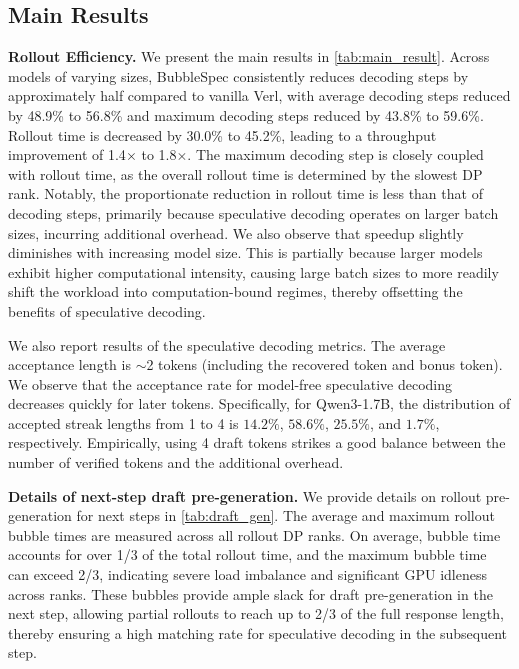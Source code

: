 \subsection{Main Results}
\textbf{Rollout Efficiency.} We present the main results in \autoref{tab:main_result}. Across models of varying sizes, BubbleSpec consistently reduces decoding steps by approximately half compared to vanilla Verl, with average decoding steps reduced by 48.9\% to 56.8\% and maximum decoding steps reduced by 43.8\% to 59.6\%. Rollout time is decreased by 30.0\% to 45.2\%, leading to a throughput improvement of 1.4$\times$ to 1.8$\times$. The maximum decoding step is closely coupled with rollout time, as the overall rollout time is determined by the slowest DP rank. Notably, the proportionate reduction in rollout time is less than that of decoding steps, primarily because speculative decoding operates on larger batch sizes, incurring additional overhead. We also observe that speedup slightly diminishes with increasing model size. This is partially because larger models exhibit higher computational intensity, causing large batch sizes to more readily shift the workload into computation-bound regimes, thereby offsetting the benefits of speculative decoding.

We also report results of the speculative decoding metrics. The average acceptance length is $\sim$2 tokens (including the recovered token and bonus token). We observe that the acceptance rate for model-free speculative decoding decreases quickly for later tokens. Specifically, for Qwen3-1.7B, the distribution of accepted streak lengths from 1 to 4 is \(14.2\%\), \(58.6\%\), \(25.5\%\), and \(1.7\%\), respectively. Empirically, using 4 draft tokens strikes a good balance between the number of verified tokens and the additional overhead.



\textbf{Details of next-step draft pre-generation.} 
We provide details on rollout pre-generation for next steps in \autoref{tab:draft_gen}. The average and maximum rollout bubble times are measured across all rollout DP ranks. On average, bubble time accounts for over 1/3 of the total rollout time, and the maximum bubble time can exceed 2/3, indicating severe load imbalance and significant GPU idleness across ranks. These bubbles provide ample slack for draft pre-generation in the next step, allowing partial rollouts to reach up to 2/3 of the full response length, thereby ensuring a high matching rate for speculative decoding in the subsequent step.


